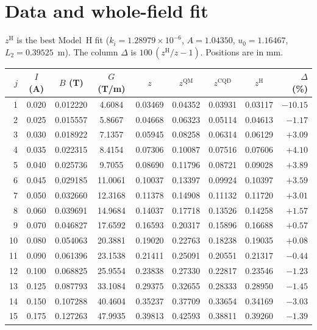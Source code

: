 \documentclass[11pt,a4paper]{article}
\newcommand{\QM}{\mathrm{QM}}
\begin{document}
\appendix
\section{Data and whole-field fit}
\label{app:data}
$z^\text{H}$ is the best Model~H fit ($k_i = 1.28979\times10^{-6}$, $A = 1.04350$, $u_0 = 1.16467$, $L_2 = 0.39525$~m). The column $\Delta$ is $100\,(z^\text{H}/z - 1)$. Positions are in mm.
\begin{center}
\small
\begin{tabular}{rcccccccr}
\toprule
$j$ & $I$ (A) & $B$ (T) & $G$ (T/m) & $z$ & $z^{\QM}$ & $z^\text{CQD}$ & $z^\text{H}$ & $\Delta$ (\%)\\
\midrule
 1 & 0.020 & 0.012220 & 4.6084 & 0.03469 & 0.04352 & 0.03931 & 0.03117 & $-10.15$ \\
 2 & 0.025 & 0.015557 & 5.8667 & 0.04668 & 0.06323 & 0.05114 & 0.04613 & $-1.17$ \\
 3 & 0.030 & 0.018922 & 7.1357 & 0.05945 & 0.08258 & 0.06314 & 0.06129 & $+3.09$ \\
 4 & 0.035 & 0.022315 & 8.4154 & 0.07306 & 0.10087 & 0.07516 & 0.07606 & $+4.10$ \\
 5 & 0.040 & 0.025736 & 9.7055 & 0.08690 & 0.11796 & 0.08721 & 0.09028 & $+3.89$ \\
 6 & 0.045 & 0.029185 & 11.0061 & 0.10037 & 0.13397 & 0.09924 & 0.10397 & $+3.59$ \\
 7 & 0.050 & 0.032660 & 12.3168 & 0.11378 & 0.14908 & 0.11132 & 0.11720 & $+3.01$ \\
 8 & 0.060 & 0.039691 & 14.9684 & 0.14037 & 0.17718 & 0.13526 & 0.14258 & $+1.57$ \\
 9 & 0.070 & 0.046827 & 17.6592 & 0.16593 & 0.20317 & 0.15896 & 0.16688 & $+0.57$ \\
10 & 0.080 & 0.054063 & 20.3881 & 0.19020 & 0.22763 & 0.18238 & 0.19035 & $+0.08$ \\
11 & 0.090 & 0.061396 & 23.1538 & 0.21411 & 0.25091 & 0.20551 & 0.21317 & $-0.44$ \\
12 & 0.100 & 0.068825 & 25.9554 & 0.23838 & 0.27330 & 0.22817 & 0.23546 & $-1.23$ \\
13 & 0.125 & 0.087793 & 33.1084 & 0.29375 & 0.32655 & 0.28333 & 0.28950 & $-1.45$ \\
14 & 0.150 & 0.107288 & 40.4604 & 0.35237 & 0.37709 & 0.33654 & 0.34169 & $-3.03$ \\
15 & 0.175 & 0.127263 & 47.9935 & 0.39813 & 0.42593 & 0.38811 & 0.39260 & $-1.39$ \\

\end{tabular}
\end{center}
\end{document}
